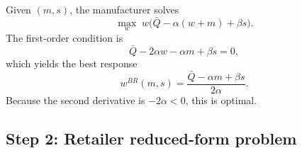 Given $(m,s)$, the manufacturer solves
\begin{equation}
 \max_w\; w\bigl(\bar Q-\alpha(w+m)+\beta s\bigr).
\end{equation}
The first-order condition is
\begin{equation}
 \bar Q-2\alpha w-\alpha m+\beta s=0,
\end{equation}
which yields the best response
\begin{equation}
 w^{BR}(m,s)=\frac{\bar Q-\alpha m+\beta s}{2\alpha}.
 \label{eq:app_rs_brw}
\end{equation}
Because the second derivative is $-2\alpha<0$, this is optimal.

\subsection{Step 2: Retailer reduced-form problem}

